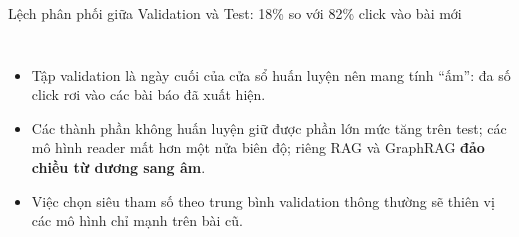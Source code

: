 \documentclass[aspectratio=169,t]{beamer}
\begin{document}
\begin{frame}[shrink]{Lệch phân phối giữa Validation và Test: 18\% so với 82\% click vào bài mới}
\begin{columns}[T,onlytextwidth]
\begin{itemize}
  \setlength{\itemsep}{3pt}
  \item Tập validation là ngày cuối của cửa sổ huấn luyện nên mang tính ``ấm'': đa số click rơi vào các bài báo đã xuất hiện.
  \item Các thành phần không huấn luyện giữ được phần lớn mức tăng trên test; các mô hình reader mất hơn một nửa biên độ; riêng RAG và GraphRAG \textbf{đảo chiều từ dương sang âm}.
  \item Việc chọn siêu tham số theo trung bình validation thông thường sẽ thiên vị các mô hình chỉ mạnh trên bài cũ.
\end{itemize}
\end{columns}
\par\kern0pt%
\end{frame}
\end{document}
